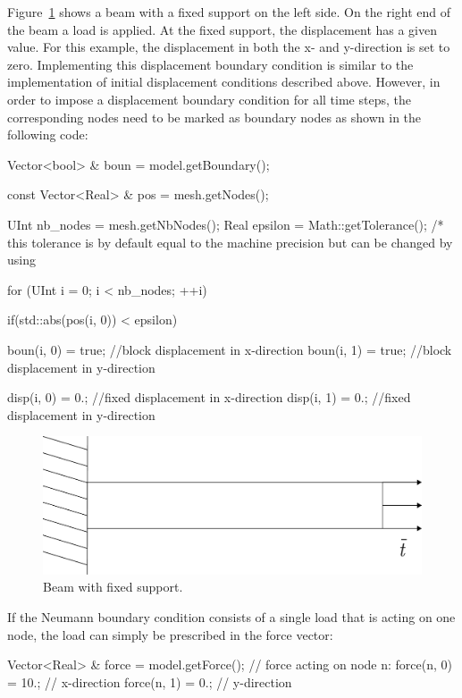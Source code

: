 \documentclass[a4paper,11pt]{book}
\newcommand{\code}[1]{\texttt{#1}}
\begin{document}
Figure~\ref{fig:smm:dirichlet_bc} shows a beam with  a fixed support on the left
side. On the right end of the beam  a load is applied. At the fixed support, the
displacement has a  given value. For this example, the  displacement in both the
x-  and y-direction  is set  to  zero. Implementing  this displacement  boundary
condition is  similar to the  implementation of initial  displacement conditions
described above. However,  in order to impose a  displacement boundary condition
for all time steps, the corresponding  nodes need to be marked as boundary nodes
as shown in the following code:
\begin{cpp}
  Vector<bool> & boun = model.getBoundary();

  const Vector<Real> & pos = mesh.getNodes();

  UInt nb_nodes = mesh.getNbNodes();
  Real epsilon = Math::getTolerance();
  /* this  tolerance is  by default equal  to the  machine precision but  can be changed by using %

  for (UInt i = 0; i < nb_nodes; ++i) {
    if(std::abs(pos(i, 0)) < epsilon) {
      boun(i, 0) = true;  //block displacement in x-direction
      boun(i, 1) = true;  //block displacement in y-direction

      disp(i, 0) = 0.;   //fixed displacement in x-direction
      disp(i, 1) = 0.;   //fixed displacement in y-direction
    }
  }
\end{cpp}
\begin{figure}[!htb]
  \centering
  \includegraphics[scale=0.4]{figures/dirichlet}
  \caption{Beam with fixed support.\label{fig:smm:dirichlet_bc}}
\end{figure}

If the Neumann boundary condition consists of a single load that is acting on one
node, the load can simply be prescribed in the force vector:
\begin{cpp}
  Vector<Real> & force = model.getForce();
  // force acting on node n:
  force(n, 0) = 10.; // x-direction
  force(n, 1) = 0.; // y-direction
\end{cpp}
\end{document}
